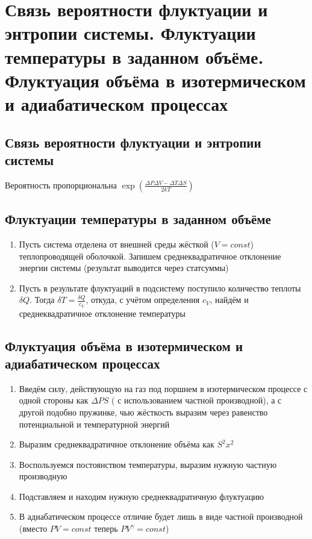 \documentclass[a4paper, 14pt]{article}
\begin{document}
    \section{Связь вероятности флуктуации и энтропии системы.
    Флуктуации температуры в заданном объёме.
    Флуктуация объёма в изотермическом и адиабатическом процессах}

    \subsection{Связь вероятности флуктуации и энтропии системы}

    Вероятность пропорциональна $\exp \left(\frac{\Delta P \Delta V - \Delta T \Delta S}{2kT}\right)$

    \subsection{Флуктуации температуры в заданном объёме}

    \begin{enumerate}
        \item Пусть система отделена от внешней среды жёсткой ($V = const$) теплопроводящей оболочкой.
        Запишем среднеквадратичное отклонение энергии системы (результат выводится через статсуммы)
        \item Пусть в результате флуктуаций в подсистему поступило количество теплоты $\delta Q$.
        Тогда $\delta T = \frac{\delta Q}{c_V}$, откуда, с учётом определения $c_V$, найдём и среднеквадратичное
        отклонение температуры
    \end{enumerate}

    \subsection{Флуктуация объёма в изотермическом и адиабатическом процессах}

    \begin{enumerate}
        \item Введём силу, действующую на газ под поршнем в изотермическом процессе с одной стороны как $\Delta PS$ (
        с использованием частной производной), а с другой подобно пружинке, чью жёсткость выразим через равенство
        потенциальной и температурной энергий
        \item Выразим среднеквадратичное отклонение объёма как $S^2 x^2$
        \item Воспользуемся постоянством температуры, выразим нужную частную производную
        \item Подставляем и находим нужную среднеквадратичную флуктуацию
        \item В адиабатическом процессе отличие будет лишь в виде частной производной (вместо $PV = const$ теперь $PV^\gamma = const$)
    \end{enumerate}
\end{document}
